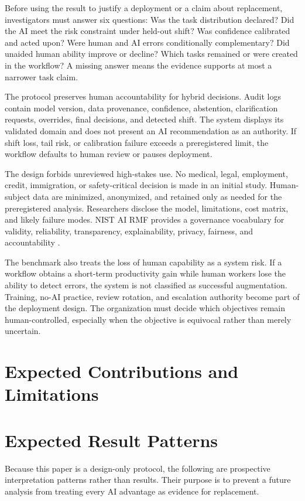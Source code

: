 \documentclass[conference]{IEEEtran}
\begin{document}
Before using the result to justify a deployment or a claim about replacement, investigators must answer six questions: Was the task distribution declared? Did the AI meet the risk constraint under held-out shift? Was confidence calibrated and acted upon? Were human and AI errors conditionally complementary? Did unaided human ability improve or decline? Which tasks remained or were created in the workflow? A missing answer means the evidence supports at most a narrower task claim.

The protocol preserves human accountability for hybrid decisions. Audit logs contain model version, data provenance, confidence, abstention, clarification requests, overrides, final decisions, and detected shift. The system displays its validated domain and does not present an AI recommendation as an authority. If shift loss, tail risk, or calibration failure exceeds a preregistered limit, the workflow defaults to human review or pauses deployment.

The design forbids unreviewed high-stakes use. No medical, legal, employment, credit, immigration, or safety-critical decision is made in an initial study. Human-subject data are minimized, anonymized, and retained only as needed for the preregistered analysis. Researchers disclose the model, limitations, cost matrix, and likely failure modes. NIST AI RMF provides a governance vocabulary for validity, reliability, transparency, explainability, privacy, fairness, and accountability \cite{nist2023}.

The benchmark also treats the loss of human capability as a system risk. If a workflow obtains a short-term productivity gain while human workers lose the ability to detect errors, the system is not classified as successful augmentation. Training, no-AI practice, review rotation, and escalation authority become part of the deployment design. The organization must decide which objectives remain human-controlled, especially when the objective is equivocal rather than merely uncertain.

\section{Expected Contributions and Limitations}

\section{Expected Result Patterns}

Because this paper is a design-only protocol, the following are prospective interpretation patterns rather than results. Their purpose is to prevent a future analysis from treating every AI advantage as evidence for replacement.
\end{document}
